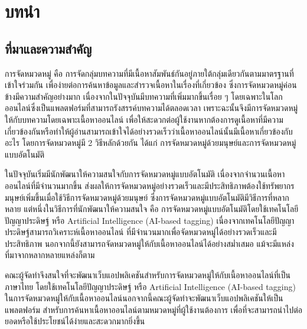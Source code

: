 \documentclass[12pt,oneside,openright,a4paper]{cpe-thai-project}
\begin{document}


\chapter{บทนำ}
\section{ที่มาและความสำคัญ}
\hspace{1cm}การจัดหมวดหมู่ คือ การจัดกลุ่มบทความที่มีเนื้อหาสัมพันธ์กันอยู่ภายใต้กลุ่มเดียวกันตามมาตรฐานที่เข้าใจร่วมกัน 
เพื่อง่ายต่อการค้นหาข้อมูลและสำรวจเนื้อหาในเรื่องที่เกี่ยวข้อง \cite{tagmean} ซึ่งการจัดหมวดหมู่ค่อนข้างมีความสำคัญอย่างมาก 
เนื่องจากในปัจจุบันมีบทความที่เพิ่มมากขึ้นเรื่อย ๆ โดยเฉพาะในโลกออนไลน์ซึ่งเป็นแพลตฟอร์มที่สามารถรังสรรค์บทความได้ตลอดเวลา 
เพราะฉะนั้นจึงมีการจัดหมวดหมู่ให้กับบทความโดยเฉพาะเนื้อหาออนไลน์
เพื่อให้สะดวกต่อผู้ใช้งานหากต้องการดูเนื้อหาที่มีความเกี่ยวข้องกันหรือทำให้ผู้อ่านสามารถเข้าใจได้อย่างรวดเร็วว่าเนื้อหาออนไลน์นั้นมีเนื้อหาเกี่ยวข้องกับอะไร 
โดยการจัดหมวดหมู่มี 2 วิธีหลักด้วยกัน ได้แก่ การจัดหมวดหมู่ด้วยมนุษย์และการจัดหมวดหมู่แบบอัตโนมัติ 

\hspace{1cm}ในปัจจุบันเริ่มมีนักพัฒนาให้ความสนใจกับการจัดหมวดหมู่แบบอัตโนมัติ เนื่องจากจำนวนเนื้อหาออนไลน์ที่มีจำนวนมากขึ้น 
ส่งผลให้การจัดหมวดหมู่อย่างรวดเร็วและมีประสิทธิภาพต้องใช้ทรัพยากรมนุษย์เพิ่มขึ้นเมื่อใช้วิธีการจัดหมวดหมู่ด้วยมนุษย์ \cite{pantip}
ซึ่งการจัดหมวดหมู่แบบอัตโนมัติมีวิธีการที่หลากหลาย แต่หนึ่งในวิธีการที่นักพัฒนาให้ความสนใจ คือ การจัดหมวดหมู่แบบอัตโนมัติโดยใช้เทคโนโลยีปัญญาประดิษฐ์ 
หรือ Artificial Intelligence (AI-based tagging) เนื่องจากเทคโนโลยีปัญญาประดิษฐ์สามารถวิเคราะห์เนื้อหาออนไลน์
ที่มีจำนวนมากเพื่อจัดหมวดหมู่ได้อย่างรวดเร็วและมีประสิทธิภาพ นอกจากนี้ยังสามารถจัดหมวดหมู่ให้กับเนื้อหาออนไลน์ได้อย่างสม่ำเสมอ 
แม้จะมีแหล่งที่มาจากหลากหลายแหล่งก็ตาม \cite{ai_tagging}

\hspace{1cm}คณะผู้จัดทำจึงสนใจที่จะพัฒนาเว็บแอปพลิเคชันสำหรับการจัดหมวดหมู่ให้กับเนื้อหาออนไลน์ที่เป็นภาษาไทย 
โดยใช้เทคโนโลยีปัญญาประดิษฐ์ หรือ Artificial Intelligence (AI-based tagging) ในการจัดหมวดหมู่ให้กับเนื้อหาออนไลน์นอกจากนี้คณะผู้จัดทำจะพัฒนาเว็บแอปพลิเคชันให้เป็นแพลตฟอร์ม 
สำหรับการค้นหาเนื้อหาออนไลน์ตามหมวดหมู่ที่ผู้ใช้งานต้องการ เพื่อที่จะสามารถนำไปต่อ ยอดหรือใช้ประโยชน์ได้ง่ายและสะดวกมากยิ่งขึ้น 
\end{document}
